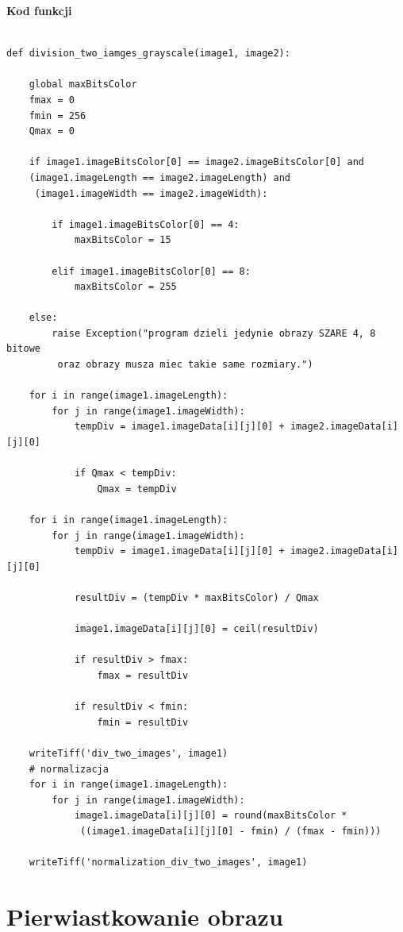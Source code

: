 \documentclass[magisterska,openany]{pracadypl}
\begin{document}
\newpage
\textbf{\Large Kod funkcji}
   
\lstset{language=Python}
\vspace{0.25cm}
\begin{lstlisting}[caption={Dzielenie dwóch obrazów}]

def division_two_iamges_grayscale(image1, image2):

    global maxBitsColor
    fmax = 0
    fmin = 256
    Qmax = 0

    if image1.imageBitsColor[0] == image2.imageBitsColor[0] and
    (image1.imageLength == image2.imageLength) and
     (image1.imageWidth == image2.imageWidth):

        if image1.imageBitsColor[0] == 4:
            maxBitsColor = 15

        elif image1.imageBitsColor[0] == 8:
            maxBitsColor = 255

    else:
        raise Exception("program dzieli jedynie obrazy SZARE 4, 8 bitowe
         oraz obrazy musza miec takie same rozmiary.")

    for i in range(image1.imageLength):
        for j in range(image1.imageWidth):
            tempDiv = image1.imageData[i][j][0] + image2.imageData[i][j][0]

            if Qmax < tempDiv:
                Qmax = tempDiv

    for i in range(image1.imageLength):
        for j in range(image1.imageWidth):
            tempDiv = image1.imageData[i][j][0] + image2.imageData[i][j][0]

            resultDiv = (tempDiv * maxBitsColor) / Qmax

            image1.imageData[i][j][0] = ceil(resultDiv)

            if resultDiv > fmax:
                fmax = resultDiv

            if resultDiv < fmin:
                fmin = resultDiv

    writeTiff('div_two_images', image1)
    # normalizacja
    for i in range(image1.imageLength):
        for j in range(image1.imageWidth):
            image1.imageData[i][j][0] = round(maxBitsColor *
             ((image1.imageData[i][j][0] - fmin) / (fmax - fmin)))

    writeTiff('normalization_div_two_images', image1)

\end{lstlisting}


\newpage
\section{Pierwiastkowanie obrazu}
\end{document}
